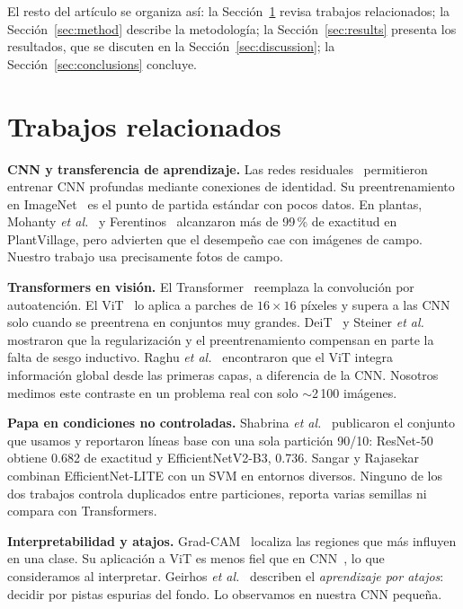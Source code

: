 \documentclass[conference,a4paper]{IEEEtran}
\begin{document}
El resto del artículo se organiza así: la Sección~\ref{sec:related} revisa trabajos relacionados; la Sección~\ref{sec:method} describe la metodología; la Sección~\ref{sec:results} presenta los resultados, que se discuten en la Sección~\ref{sec:discussion}; la Sección~\ref{sec:conclusions} concluye.

\section{Trabajos relacionados}\label{sec:related}
\textbf{CNN y transferencia de aprendizaje.} Las redes residuales~\cite{he2016resnet} permitieron entrenar CNN profundas mediante conexiones de identidad. Su preentrenamiento en ImageNet~\cite{deng2009imagenet} es el punto de partida estándar con pocos datos. En plantas, Mohanty \textit{et al.}~\cite{mohanty2016plant} y Ferentinos~\cite{ferentinos2018plant} alcanzaron más de 99\,\% de exactitud en PlantVillage, pero advierten que el desempeño cae con imágenes de campo. Nuestro trabajo usa precisamente fotos de campo.

\textbf{Transformers en visión.} El Transformer~\cite{vaswani2017attention} reemplaza la convolución por autoatención. El ViT~\cite{dosovitskiy2021vit} lo aplica a parches de $16\times16$ píxeles y supera a las CNN solo cuando se preentrena en conjuntos muy grandes. DeiT~\cite{touvron2021deit} y Steiner \textit{et al.}~\cite{steiner2022howtotrain} mostraron que la regularización y el preentrenamiento compensan en parte la falta de sesgo inductivo. Raghu \textit{et al.}~\cite{raghu2021vitsee} encontraron que el ViT integra información global desde las primeras capas, a diferencia de la CNN. Nosotros medimos este contraste en un problema real con solo $\sim$2\,100 imágenes.

\textbf{Papa en condiciones no controladas.} Shabrina \textit{et al.}~\cite{shabrina2024potato} publicaron el conjunto que usamos y reportaron líneas base con una sola partición 90/10: ResNet-50 obtiene 0.682 de exactitud y EfficientNetV2-B3, 0.736. Sangar y Rajasekar~\cite{sangar2025potato} combinan EfficientNet-LITE con un SVM en entornos diversos. Ninguno de los dos trabajos controla duplicados entre particiones, reporta varias semillas ni compara con Transformers.

\textbf{Interpretabilidad y atajos.} Grad-CAM~\cite{selvaraju2017gradcam} localiza las regiones que más influyen en una clase. Su aplicación a ViT es menos fiel que en CNN~\cite{chefer2021transformer}, lo que consideramos al interpretar. Geirhos \textit{et al.}~\cite{geirhos2020shortcut} describen el \emph{aprendizaje por atajos}: decidir por pistas espurias del fondo. Lo observamos en nuestra CNN pequeña.
\end{document}
